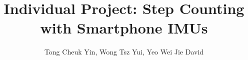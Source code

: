 \documentclass[sigconf, anonymous=false, review=true, 10pt]{acmart}
\def\sysname{\textsc{GPR}\xspace}
\begin{document}
\title[\sysname]{Individual Project: Step Counting with Smartphone IMUs}


\author{Tong Cheuk Yin, Wong Tsz Yui, Yeo Wei Jie David}




\renewcommand{\shortauthors}{\sysname}



\maketitle



% 

% 
\end{document}
